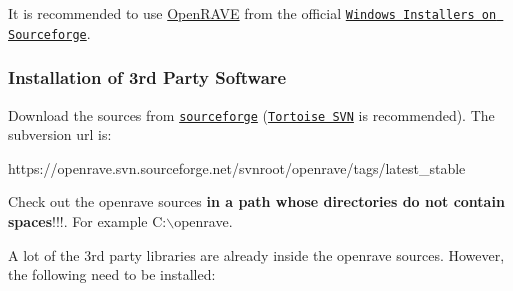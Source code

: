 It is recommended to use \hyperlink{namespaceOpenRAVE}{OpenRAVE} from the official \href{http://sourceforge.net/projects/openrave/files/}{\tt Windows Installers on Sourceforge}.\hypertarget{installation__windows_iwin_octavematlab}{}\subsubsection{Installation of 3rd Party Software}\label{installation__windows_iwin_octavematlab}
Download the sources from \href{http://sourceforge.net/projects/openrave}{\tt sourceforge} (\href{http://tortoisesvn.net/downloads.html/}{\tt Tortoise SVN} is recommended). The subversion url is:

\begin{DoxyVerb}
https://openrave.svn.sourceforge.net/svnroot/openrave/tags/latest_stable
\end{DoxyVerb}


Check out the openrave sources {\bfseries in a path whose directories do not contain spaces}!!!. For example {\ttfamily C:$\backslash$openrave}.

A lot of the 3rd party libraries are already inside the openrave sources. However, the following need to be installed:


